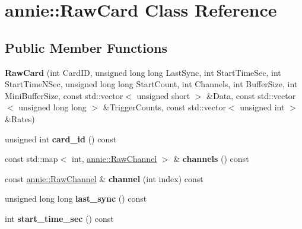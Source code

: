 \hypertarget{classannie_1_1RawCard}{
\section{annie::RawCard Class Reference}
\label{classannie_1_1RawCard}
}
\subsection*{Public Member Functions}
\begin{DoxyCompactItemize}
\item 
\hypertarget{classannie_1_1RawCard_ab60fad3bbc6ac3ef66759f4436a57413}{
{\bfseries RawCard} (int CardID, unsigned long long LastSync, int StartTimeSec, int StartTimeNSec, unsigned long long StartCount, int Channels, int BufferSize, int MiniBufferSize, const std::vector$<$ unsigned short $>$ \&Data, const std::vector$<$ unsigned long long $>$ \&TriggerCounts, const std::vector$<$ unsigned int $>$ \&Rates)}
\label{classannie_1_1RawCard_ab60fad3bbc6ac3ef66759f4436a57413}

\item 
\hypertarget{classannie_1_1RawCard_ae80499190a7ce2c3b2b178e9cb2c1aef}{
unsigned int {\bfseries card\_\-id} () const }
\label{classannie_1_1RawCard_ae80499190a7ce2c3b2b178e9cb2c1aef}

\item 
\hypertarget{classannie_1_1RawCard_a1ce186081972d76fe0f291e824f1a6c2}{
const std::map$<$ int, \hyperlink{classannie_1_1RawChannel}{annie::RawChannel} $>$ \& {\bfseries channels} () const }
\label{classannie_1_1RawCard_a1ce186081972d76fe0f291e824f1a6c2}

\item 
\hypertarget{classannie_1_1RawCard_aaf7dd447d1038242ca0651fda2570212}{
const \hyperlink{classannie_1_1RawChannel}{annie::RawChannel} \& {\bfseries channel} (int index) const }
\label{classannie_1_1RawCard_aaf7dd447d1038242ca0651fda2570212}

\item 
\hypertarget{classannie_1_1RawCard_a897bdf7938f0336e1227169f8ffc5983}{
unsigned long long {\bfseries last\_\-sync} () const }
\label{classannie_1_1RawCard_a897bdf7938f0336e1227169f8ffc5983}

\item 
\hypertarget{classannie_1_1RawCard_a35a59e99e1f3f9bad798edf7722844e7}{
int {\bfseries start\_\-time\_\-sec} () const }
\label{classannie_1_1RawCard_a35a59e99e1f3f9bad798edf7722844e7}


\end{DoxyCompactItemize}
